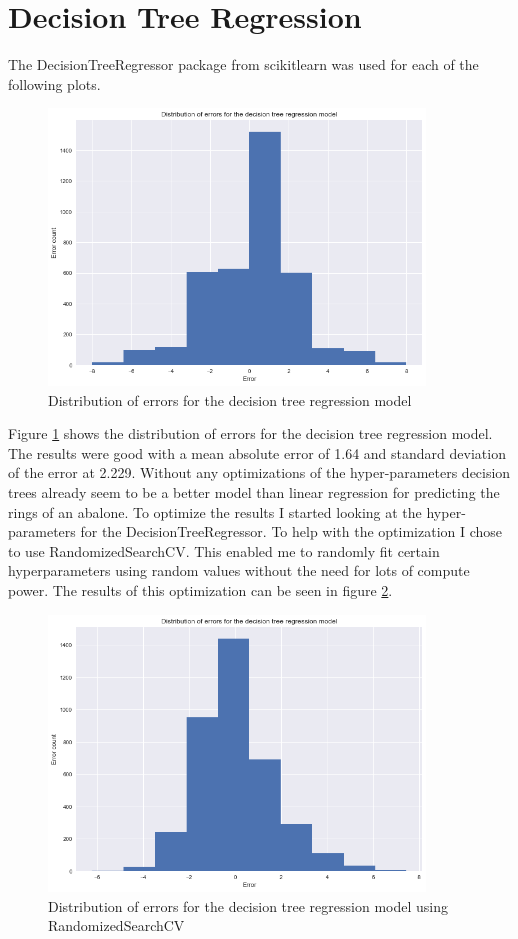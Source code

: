 \section{Decision Tree Regression}

The DecisionTreeRegressor package from scikitlearn was used for each of the following plots. 
\begin{figure}[H]
  \centering
  \includegraphics[scale=0.5,width=100mm]{./images/abalone-decision-tree-regression-start.png}
  \caption{Distribution of errors for the decision tree regression model}
  \label{fig:abalone-decision-tree-regression-start}
\end{figure}
Figure \ref{fig:abalone-decision-tree-regression-start} shows the distribution of errors for the decision tree regression model. The results were good with a mean absolute error of 1.64 and standard deviation of the error at 2.229. Without any optimizations of the hyper-parameters decision trees already seem to be a better model than linear regression for predicting the rings of an abalone. To optimize the results I started looking at the hyper-parameters for the DecisionTreeRegressor. To help with the optimization I chose to use RandomizedSearchCV. This enabled me to randomly fit certain hyperparameters using random values without the need for lots of compute power. The results of this optimization can be seen in figure \ref{fig:abalone-decision-tree-regression-randomcv}.
\begin{figure}[H]
  \centering
  \includegraphics[scale=0.5,width=100mm]{./images/abalone-decision-tree-regression-randomcv.png}
  \caption{Distribution of errors for the decision tree regression model using RandomizedSearchCV}
  \label{fig:abalone-decision-tree-regression-randomcv}
\end{figure}
